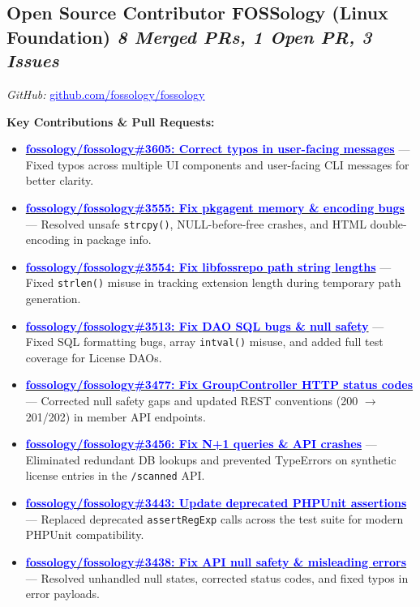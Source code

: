 \documentclass[letterpaper,10pt]{article}
\begin{document}
\subsection{Open Source Contributor \textbar{} FOSSology (Linux Foundation) \hfill \normalfont\textit{8 Merged PRs, 1 Open PR, 3 Issues}}

\noindent
\textit{GitHub:} \href{https://github.com/fossology/fossology/pulls?q=author\%3Amandar1045}{\textcolor{blue}{\underline{github.com/fossology/fossology}}}

\vspace{4pt}
\noindent\textbf{Key Contributions \& Pull Requests:}
\begin{itemize}
  \item \href{https://github.com/fossology/fossology/pull/3605}{\textcolor{blue}{\textbf{fossology/fossology\#3605: Correct typos in user-facing messages}}} --- Fixed typos across multiple UI components and user-facing CLI messages for better clarity.
  \item \href{https://github.com/fossology/fossology/pull/3555}{\textcolor{blue}{\textbf{fossology/fossology\#3555: Fix pkgagent memory \& encoding bugs}}} --- Resolved unsafe \texttt{strcpy()}, NULL-before-free crashes, and HTML double-encoding in package info.
  \item \href{https://github.com/fossology/fossology/pull/3554}{\textcolor{blue}{\textbf{fossology/fossology\#3554: Fix libfossrepo path string lengths}}} --- Fixed \texttt{strlen()} misuse in tracking extension length during temporary path generation.
  \item \href{https://github.com/fossology/fossology/pull/3513}{\textcolor{blue}{\textbf{fossology/fossology\#3513: Fix DAO SQL bugs \& null safety}}} --- Fixed SQL formatting bugs, array \texttt{intval()} misuse, and added full test coverage for License DAOs.
  \item \href{https://github.com/fossology/fossology/pull/3477}{\textcolor{blue}{\textbf{fossology/fossology\#3477: Fix GroupController HTTP status codes}}} --- Corrected null safety gaps and updated REST conventions (200 $\rightarrow$ 201/202) in member API endpoints.
  \item \href{https://github.com/fossology/fossology/pull/3456}{\textcolor{blue}{\textbf{fossology/fossology\#3456: Fix N+1 queries \& API crashes}}} --- Eliminated redundant DB lookups and prevented TypeErrors on synthetic license entries in the \texttt{/scanned} API.
  \item \href{https://github.com/fossology/fossology/pull/3443}{\textcolor{blue}{\textbf{fossology/fossology\#3443: Update deprecated PHPUnit assertions}}} --- Replaced deprecated \texttt{assertRegExp} calls across the test suite for modern PHPUnit compatibility.
  \item \href{https://github.com/fossology/fossology/pull/3438}{\textcolor{blue}{\textbf{fossology/fossology\#3438: Fix API null safety \& misleading errors}}} --- Resolved unhandled null states, corrected status codes, and fixed typos in error payloads.
\end{itemize}
\end{document}
